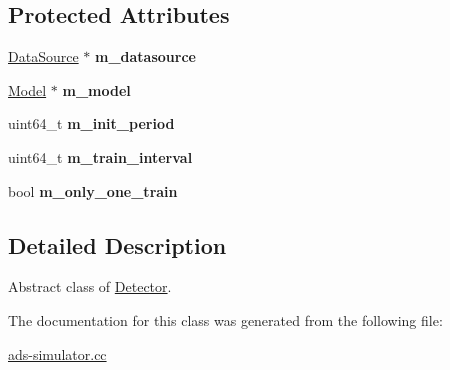 \subsection*{Protected Attributes}
\begin{DoxyCompactItemize}
\item 
\hypertarget{classDetector_a8a5e1748b785cfca369357a80f85fdc3}{}\hyperlink{classDataSource}{Data\+Source} $\ast$ {\bfseries m\+\_\+datasource}\label{classDetector_a8a5e1748b785cfca369357a80f85fdc3}

\item 
\hypertarget{classDetector_a7848ee9218c0b91632acd45180db1c31}{}\hyperlink{classModel}{Model} $\ast$ {\bfseries m\+\_\+model}\label{classDetector_a7848ee9218c0b91632acd45180db1c31}

\item 
\hypertarget{classDetector_a025d23b856701f341fbc4067457fc907}{}uint64\+\_\+t {\bfseries m\+\_\+init\+\_\+period}\label{classDetector_a025d23b856701f341fbc4067457fc907}

\item 
\hypertarget{classDetector_ab5187390b9fe4d8794517c4611c91044}{}uint64\+\_\+t {\bfseries m\+\_\+train\+\_\+interval}\label{classDetector_ab5187390b9fe4d8794517c4611c91044}

\item 
\hypertarget{classDetector_add0d08bdaa26cd6c81710da5d4be4b84}{}bool {\bfseries m\+\_\+only\+\_\+one\+\_\+train}\label{classDetector_add0d08bdaa26cd6c81710da5d4be4b84}

\end{DoxyCompactItemize}


\subsection{Detailed Description}
Abstract class of \hyperlink{classDetector}{Detector}. 

The documentation for this class was generated from the following file\+:\begin{DoxyCompactItemize}
\item 
\hyperlink{ads-simulator_8cc}{ads-\/simulator.\+cc}\end{DoxyCompactItemize}
